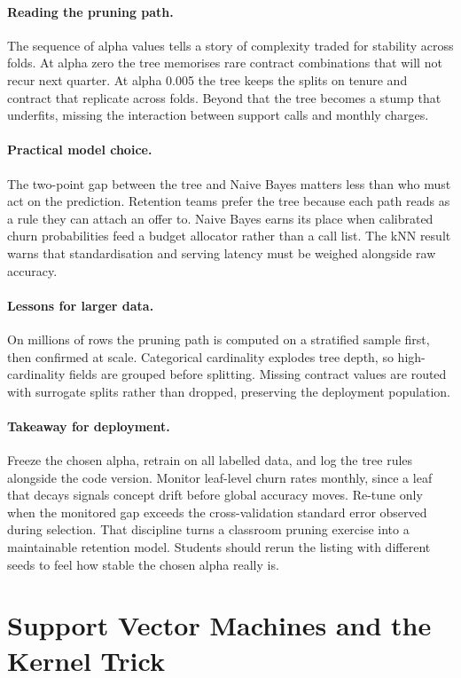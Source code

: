 \paragraph{Reading the pruning path.} The sequence of alpha values tells a story of complexity traded for stability across folds.
At alpha zero the tree memorises rare contract combinations that will not recur next quarter.
At alpha 0.005 the tree keeps the splits on tenure and contract that replicate across folds.
Beyond that the tree becomes a stump that underfits, missing the interaction between support calls and monthly charges.
\paragraph{Practical model choice.} The two-point gap between the tree and Naive Bayes matters less than who must act on the prediction.
Retention teams prefer the tree because each path reads as a rule they can attach an offer to.
Naive Bayes earns its place when calibrated churn probabilities feed a budget allocator rather than a call list.
The kNN result warns that standardisation and serving latency must be weighed alongside raw accuracy.
\paragraph{Lessons for larger data.} On millions of rows the pruning path is computed on a stratified sample first, then confirmed at scale.
Categorical cardinality explodes tree depth, so high-cardinality fields are grouped before splitting.
Missing contract values are routed with surrogate splits rather than dropped, preserving the deployment population.
\paragraph{Takeaway for deployment.} Freeze the chosen alpha, retrain on all labelled data, and log the tree rules alongside the code version.
Monitor leaf-level churn rates monthly, since a leaf that decays signals concept drift before global accuracy moves.
Re-tune only when the monitored gap exceeds the cross-validation standard error observed during selection.
That discipline turns a classroom pruning exercise into a maintainable retention model.
Students should rerun the listing with different seeds to feel how stable the chosen alpha really is.

\section{Support Vector Machines and the Kernel Trick}
\label{sec:svm}
